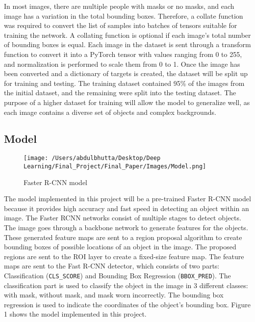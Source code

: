 \documentclass[conference]{IEEEtran}
\begin{document}
In most images, there are multiple people with masks or no masks, and each image has a variation in the total bounding boxes. Therefore, a collate function was required to convert 
the list of samples into batches of tensors suitable for training the network. A collating function is optional if each image's total number of bounding boxes is equal. Each image 
in the dataset is sent through a transform function to convert it into a PyTorch tensor with values ranging from 0 to 255, and normalization is performed to scale them from 0 to 1. 
Once the image has been converted and a dictionary of targets is created, the dataset will be split up for training and testing. The training dataset contained 95\% of the images from the 
initial dataset, and the remaining were split into the testing dataset. The purpose of a higher dataset for training will allow the model to generalize well, as each image contains a 
diverse set of objects and complex backgrounds. 

\subsection{Model} 

    \begin{figure}[!htbp]
        \centering
        \texttt{[image: /Users/abdulbhutta/Desktop/Deep Learning/Final\_Project/Final\_Paper/Images/Model.png]}
        \caption{Faster R-CNN model}
        \label{fig:my_label}
    \end{figure}
    \FloatBarrier

The model implemented in this project will be a pre-trained Faster R-CNN model because it provides high accuracy and fast speed in detecting an object within an image. The Faster 
RCNN networks consist of multiple stages to detect objects. The image goes through a backbone network to generate features for the objects. These generated feature 
maps are sent to a region proposal algorithm to create bounding boxes of possible locations of an object in the image. The proposed regions are sent to the ROI layer to create a fixed-size 
feature map. The feature maps are sent to the Fast R-CNN detector, which consists of two parts: Classification (\verb|CLS_SCORE|) and Bounding Box Regression (\verb|BBOX_PRED|). The 
classification part is used to classify the object in the image in 3 different classes: with mask, without mask, and mask worn incorrectly. The bounding box regression is used to indicate 
the coordinates of the object’s bounding box. Figure 1 shows the model implemented in this project. 
\end{document}
